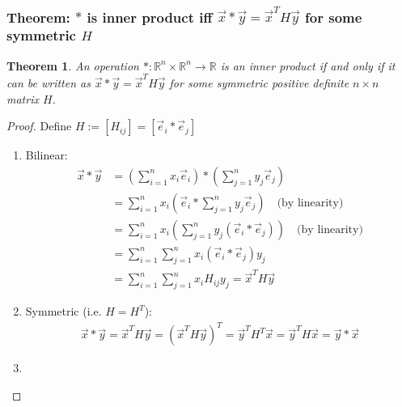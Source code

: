 \documentclass[11pt,a4paper]{article}
\newtheorem{theorem}{Theorem}
\begin{document}
\subsubsection{Theorem: $*$ is inner product iff $\vec{x}*\vec{y}=\vec{x}^T H \vec{y}$ for some symmetric $H$}
\begin{theorem}
    An operation $*: \mathbb{R}^n\times \mathbb{R}^n \rightarrow  \mathbb{R}$ is an inner product if and only if it can be written as $\vec{x}*\vec{y}=\vec{x}^T H \vec{y}$ for some symmetric positive definite $n\times n$ matrix $H$.
\end{theorem}
\begin{proof}
Define $H:=[H_{ij}]=[\vec{e}_i*\vec{e}_j]$
\begin{enumerate}
    \item Bilinear:
    \begin{equation}
        \begin{aligned}
            \vec{x}*\vec{y}&=\left(\sum_{i=1}^nx_i \vec{e}_i\right)*\left(\sum_{j=1}^ny_j \vec{e}_j\right)\\
            &=\sum_{i=1}^nx_i\left(\vec{e}_i*\sum_{j=1}^ny_j \vec{e}_j\right)\quad \text{(by linearity)}\\
            &=\sum_{i=1}^nx_i\left(\sum_{j=1}^ny_j(\vec{e}_i* \vec{e}_j)\right)\quad \text{(by linearity)}\\
            &=\sum_{i=1}^n\sum_{j=1}^nx_i\left(\vec{e}_i* \vec{e}_j\right)y_j\\
            &=\sum_{i=1}^n\sum_{j=1}^nx_iH_{ij}y_j
            =\vec{x}^T H \vec{y}
        \end{aligned}
        \nonumber
    \end{equation}
    \item Symmetric (i.e. $H=H^T$):
    \begin{equation}
        \begin{aligned}
            \vec{x}* \vec{y}=\vec{x}^TH \vec{y}=\left(\vec{x}^T H \vec{y}\right)^T= \vec{y}^T H^T \vec{x}= \vec{y}^T H \vec{x}=\vec{y}* \vec{x}
        \end{aligned}
        \nonumber
    \end{equation}
    \item 
\end{enumerate}
\end{proof}
\end{document}
